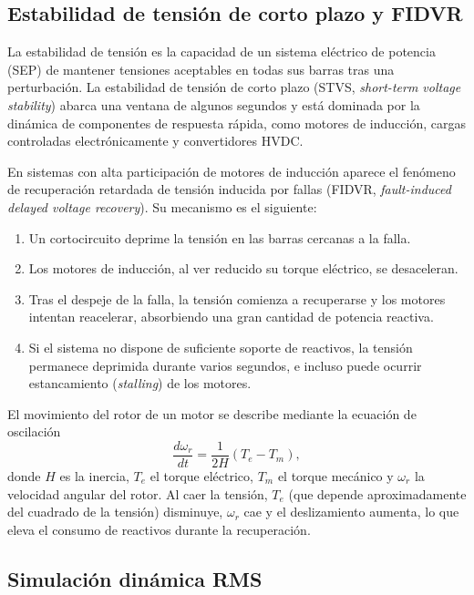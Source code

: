 
\subsection{Estabilidad de tensión de corto plazo y FIDVR}

La estabilidad de tensión es la capacidad de un sistema eléctrico de potencia (SEP) de mantener tensiones aceptables en todas sus barras tras una perturbación. La estabilidad de tensión de corto plazo (STVS, \textit{short-term voltage stability}) abarca una ventana de algunos segundos y está dominada por la dinámica de componentes de respuesta rápida, como motores de inducción, cargas controladas electrónicamente y convertidores HVDC.

En sistemas con alta participación de motores de inducción aparece el fenómeno de recuperación retardada de tensión inducida por fallas (FIDVR, \textit{fault-induced delayed voltage recovery}). Su mecanismo es el siguiente:

\begin{enumerate}
    \item Un cortocircuito deprime la tensión en las barras cercanas a la falla.
    \item Los motores de inducción, al ver reducido su torque eléctrico, se desaceleran.
    \item Tras el despeje de la falla, la tensión comienza a recuperarse y los motores intentan reacelerar, absorbiendo una gran cantidad de potencia reactiva.
    \item Si el sistema no dispone de suficiente soporte de reactivos, la tensión permanece deprimida durante varios segundos, e incluso puede ocurrir estancamiento (\textit{stalling}) de los motores.
\end{enumerate}

El movimiento del rotor de un motor se describe mediante la ecuación de oscilación
\begin{equation}
    \frac{d\omega_r}{dt} = \frac{1}{2H}\left(T_e - T_m\right),
\end{equation}
donde $H$ es la inercia, $T_e$ el torque eléctrico, $T_m$ el torque mecánico y $\omega_r$ la velocidad angular del rotor. Al caer la tensión, $T_e$ (que depende aproximadamente del cuadrado de la tensión) disminuye, $\omega_r$ cae y el deslizamiento aumenta, lo que eleva el consumo de reactivos durante la recuperación.

\subsection{Simulación dinámica RMS}

